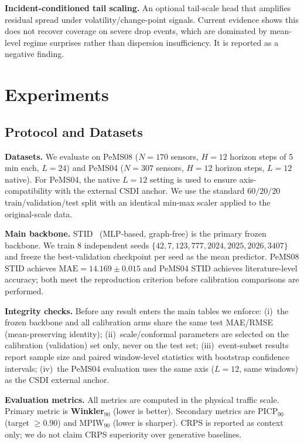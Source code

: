 \documentclass[letterpaper,journal]{IEEEtran}
\begin{document}
\textbf{Incident-conditioned tail scaling.}  An optional tail-scale head
that amplifies residual spread under volatility/change-point signals.
Current evidence shows this does not recover coverage on severe drop events,
which are dominated by mean-level regime surprises rather than dispersion
insufficiency.  It is reported as a negative finding.

\section{Experiments}

\subsection{Protocol and Datasets}
\label{sec:protocol}

\textbf{Datasets.}  We evaluate on PeMS08 ($N=170$ sensors, $H=12$ horizon
steps of 5 min each, $L=24$) and PeMS04 ($N=307$ sensors, $H=12$ horizon
steps, $L=12$ native).  For PeMS04, the native $L=12$ setting is used to
ensure axis-compatibility with the external CSDI anchor.  We use the
standard $60/20/20$ train/validation/test split with an identical
min-max scaler applied to the original-scale data.

\textbf{Main backbone.}  STID~\cite{shao2022stid} (MLP-based, graph-free)
is the primary frozen backbone.  We train 8 independent seeds
$\{42, 7, 123, 777, 2024, 2025, 2026, 3407\}$ and freeze the best-validation
checkpoint per seed as the mean predictor.  PeMS08 STID achieves
$\text{MAE}=14.169\pm0.015$ and PeMS04 STID achieves literature-level
accuracy; both meet the reproduction criterion before calibration
comparisons are performed.

\textbf{Integrity checks.}  Before any result enters the main tables we
enforce: (i)~the frozen backbone and all calibration arms share the same
test MAE/RMSE (mean-preserving identity); (ii)~scale/conformal parameters
are selected on the calibration (validation) set only, never on the test
set; (iii)~event-subset results report sample size and paired window-level
statistics with bootstrap confidence intervals; (iv)~the PeMS04 evaluation
uses the same axis ($L=12$, same windows) as the CSDI external anchor.

\textbf{Evaluation metrics.}  All metrics are computed in the physical
traffic scale.  Primary metric is \textbf{Winkler}$_{90}$ (lower is better).
Secondary metrics are PICP$_{90}$ (target $\geq 0.90$) and MPIW$_{90}$
(lower is sharper).  CRPS is reported as context only; we do not claim CRPS
superiority over generative baselines.
\end{document}
